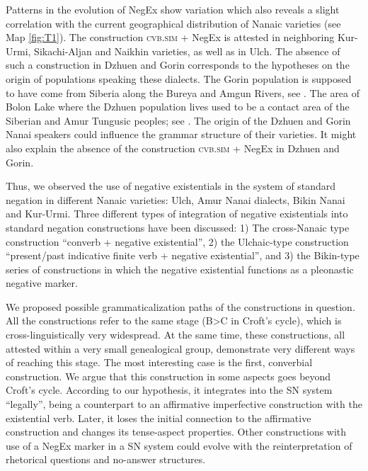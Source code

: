 \documentclass[output=paper,colorlinks,citecolor=brown]{langscibook}
\begin{document}
Patterns in the evolution of NegEx show variation which also reveals a slight correlation with the current geographical distribution of Nanaic varieties (see Map \ref{fig:T1}). The construction \textsc{cvb.sim} + NegEx is attested in neighboring Kur-Urmi, Sikachi-Aljan and Naikhin varieties, as well as in Ulch. The absence of such a construction in Dzhuen and Gorin corresponds to the hypotheses on the origin of populations speaking these dialects. The Gorin population is supposed to have come from Siberia along the Bureya and Amgun Rivers, see \citet[135]{maltseva2019a}. The area of Bolon Lake where the Dzhuen population lives used to be a contact area of the Siberian and Amur Tungusic peoples; see \citet{maltseva2019a}. The origin of the Dzhuen and Gorin Nanai speakers could influence the grammar structure of their varieties. It might also explain the absence of the construction \textsc{cvb.sim} + NegEx in Dzhuen and Gorin.

Thus, we observed the use of negative existentials in the system of standard negation in different Nanaic varieties: Ulch, Amur Nanai dialects, Bikin Nanai and Kur-Urmi. Three different types of integration of negative existentials into standard negation constructions have been discussed: 1) The cross-Nanaic type construction “converb + negative existential”, 2) the Ulchaic-type construction “present/past indicative finite verb + negative existential”, and 3) the Bikin-type series of constructions in which the negative existential functions as a pleonastic negative marker.

We proposed possible grammaticalization paths of the constructions in question. All the constructions refer to the same stage (B>C in Croft’s cycle), which is cross-linguistically very widespread. At the same time, these constructions, all attested within a very small genealogical group, demonstrate very different ways of reaching this stage. The most interesting case is the first, converbial construction. We argue that this construction in some aspects goes beyond Croft’s cycle. According to our hypothesis, it integrates into the SN system “legally”, being a counterpart to an affirmative imperfective construction with the existential verb. Later, it loses the initial connection to the affirmative construction and changes its tense-aspect properties. Other constructions with use of a NegEx marker in a SN system could evolve with the reinterpretation of rhetorical questions and no-answer structures.
\end{document}
